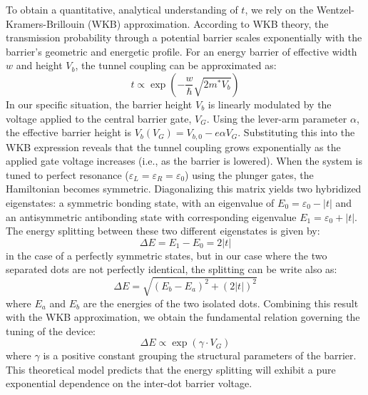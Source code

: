To obtain a quantitative, analytical understanding of $t$, we rely on the Wentzel-Kramers-Brillouin (WKB) approximation. According to WKB theory, the transmission probability through a potential barrier scales exponentially with the barrier's geometric and energetic profile. For an energy barrier of effective width $w$ and height $V_b$, the tunnel coupling can be approximated as:
\begin{equation}
    t \propto \exp\left( - \frac{w}{\hbar} \sqrt{2m^* V_b} \right)
\end{equation}
In our specific situation, the barrier height $V_b$ is linearly modulated by the voltage applied to the central barrier gate, $V_G$. Using the lever-arm parameter $\alpha$, the effective barrier height is $V_b(V_G) = V_{b,0} - e\alpha V_G$. Substituting this into the WKB expression reveals that the tunnel coupling grows exponentially as the applied gate voltage increases (i.e., as the barrier is lowered).
When the system is tuned to perfect resonance ($\varepsilon_L = \varepsilon_R = \varepsilon_0$) using the plunger gates, the Hamiltonian becomes symmetric. Diagonalizing this matrix yields two hybridized eigenstates: a symmetric bonding state, with an eigenvalue of $E_0 = \varepsilon_0 - |t|$ and an antisymmetric antibonding state with corresponding eigenvalue $E_1 = \varepsilon_0 + |t|$. The energy splitting between these two different eigenstates is given by:
\begin{equation}
    \Delta E = E_1 - E_0 = 2|t|
\end{equation}
in the case of a perfectly symmetric states, but in our case where the two separated dots are not perfectly identical, the splitting can be write also as:
\begin{equation}
    \Delta E = \sqrt{(E_b - E_a)^2 + (2|t|)^2}
\end{equation}
where $E_a$ and $E_b$ are the energies of the two isolated dots.
Combining this result with the WKB approximation, we obtain the fundamental relation governing the tuning of the device:
\begin{equation}
    \Delta E \propto \exp( \gamma \cdot V_G )
\end{equation}
where $\gamma$ is a positive constant grouping the structural parameters of the barrier. This theoretical model predicts that the energy splitting will exhibit a pure exponential dependence on the inter-dot barrier voltage.


